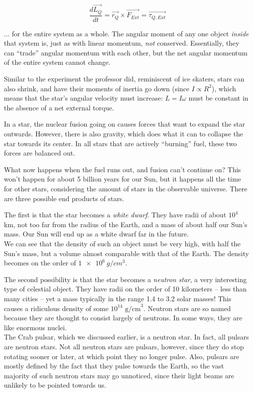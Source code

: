 \begin{equation}
\frac{d\vec{L_Q}}{dt} = \vec{r_Q} \times \vec{F_{Ext}} = \vec{\tau_{Q,Ext}}
\end{equation}

... for the entire system as a whole. The angular moment of any one object \emph{inside} that system is, just as with linear momentum, \emph{not} conserved. Essentially, they can ``trade'' angular momentum with each other, but the net angular momentum of the entire system cannot change.

Similar to the experiment the professor did, reminiscent of ice skaters, stars can also shrink, and have their moments of inertia go down (since $I \propto R^2$), which means that the star's angular velocity must increase: $L = I \omega$ must be constant in the absence of a net external torque.

In a star, 	the nuclear fusion going on causes forces that want to expand the star outwards. However, there is also gravity, which does what it can to collapse the star towards its center. In all stars that are actively ``burning'' fuel, these two forces are balanced out.

What now happens when the fuel runs out, and fusion can't continue on? This won't happen for about 5 billion years for our Sun, but it happens all the time for other stars, considering the amount of stars in the observable universe. There are three possible end products of stars.

The first is that the star becomes a \emph{white dwarf}. They have radii of about $10^4$ km, not too far from the radius of the Earth, and a mass of about half our Sun's mass. Our Sun will end up as a white dwarf far in the future.\\
We can see that the density of such an object must be very high, with half the Sun's mass, but a volume almost comparable with that of the Earth. The density becomes on the order of $\SI{1e6}{g/cm^3}$.

The second possibility is that the star becomes a \emph{neutron star}, a very interesting type of celestial object. They have radii on the order of 10 kilometers -- less than many cities -- yet a mass typically in the range 1.4 to 3.2 solar masses! This causes a ridiculous density of some $10^{14} \text{ g/cm}^3$. Neutron stars are so named because they are thought to consist largely of neutrons. In some ways, they are like enormous nuclei.\\
The Crab pulsar, which we discussed earlier, is a neutron star. In fact, all pulsars are neutron stars. Not all neutron stars are pulsars, however, since they do stop rotating sooner or later, at which point they no longer pulse. Also, pulsars are mostly defined by the fact that they pulse towards the Earth, so the vast majority of such neutron stars may go unnoticed, since their light beams are unlikely to be pointed towards us.

